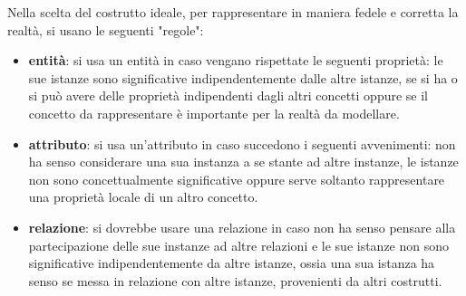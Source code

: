 \documentclass[a4paper,12pt, oneside]{book}
\begin{document}
Nella scelta del costrutto ideale, per rappresentare in maniera fedele e corretta la realtà, si usano le seguenti "regole":
\begin{itemize}
	\item \textbf{entità}: si usa un entità in caso vengano rispettate le seguenti proprietà:
	      le sue istanze sono significative indipendentemente dalle altre istanze, se si ha o si può avere delle proprietà
	      indipendenti dagli altri concetti oppure se il concetto da rappresentare è importante per la realtà da modellare.

	\item \textbf{attributo}: si usa un'attributo in caso succedono i seguenti avvenimenti: non ha senso
	      considerare una sua instanza a se stante ad altre instanze, le istanze non sono concettualmente significative
	      oppure serve soltanto rappresentare una proprietà locale di un altro concetto.

	\item \textbf{relazione}: si dovrebbe usare una relazione in caso non ha senso pensare alla partecipazione
	      delle sue instanze ad altre relazioni e le sue istanze non sono significative indipendentemente da altre istanze,
	      ossia una sua istanza ha senso se messa in relazione con altre istanze, provenienti da altri costrutti.

\end{itemize}
\end{document}
